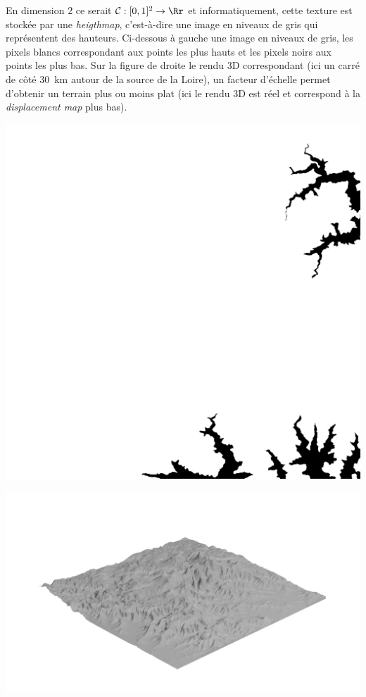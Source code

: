 \documentclass[11pt,class=report,crop=false]{standalone}
\begin{document}
En dimension $2$ ce serait $\mathcal{C} : [0,1]^2 \to \Rr$ et informatiquement, cette texture est stockée par une \emph{heigthmap}, c'est-à-dire une image en niveaux de gris qui représentent des hauteurs.
Ci-dessous à gauche une image en niveaux de gris, les pixels blancs correspondant aux points les plus hauts et les pixels noirs aux points les plus bas. Sur la figure de droite le rendu 3D correspondant (ici un carré de côté \SI{30}{\kilo\meter} autour de la source de la Loire), un facteur d'échelle permet d'obtenir un terrain plus ou moins plat (ici le rendu 3D est réel et correspond à la \emph{displacement map} plus bas).
\begin{center}
	\begin{minipage}{0.45\textwidth}
		\includegraphics[scale=\myscale,angle=-90,scale=0.15]{figures/heightmap_loire_bis}
	\end{minipage}
	\begin{minipage}{0.5\textwidth}
		\includegraphics[scale=\myscale,scale=0.17,trim={8cm 0 5cm 0}, clip]{figures/3D-loire}    
	\end{minipage}
\end{center}
\end{document}

